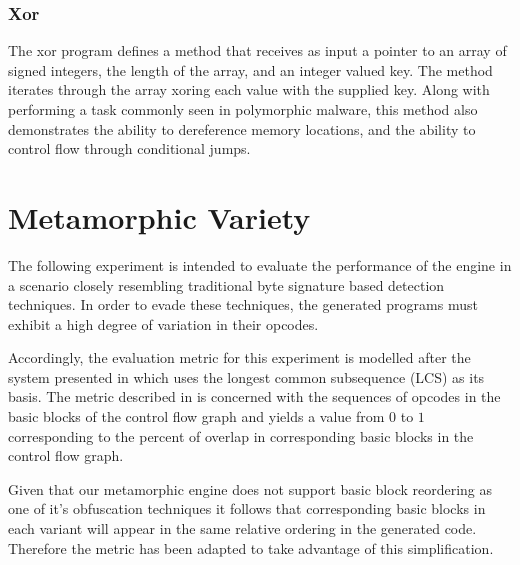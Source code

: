         \subsubsection{Xor}

            The xor program defines a method that receives as input a
            pointer to an array of signed integers, the length of the array,
            and an integer valued key. The method iterates through the array
            xoring each value with the supplied key. Along with performing a
            task commonly seen in polymorphic malware, this method also
            demonstrates the ability to dereference memory locations, and
            the ability to control flow through conditional jumps.
        
\section{Metamorphic Variety}
    
    The following experiment is intended to evaluate the performance of the
    engine in a scenario closely resembling traditional byte signature based
    detection techniques. In order to evade these techniques, the generated
    programs must exhibit a high degree of variation in their opcodes.

    Accordingly, the evaluation metric for this experiment is modelled after
    the system presented in \cite{cfg_lcs} which uses the longest common
    subsequence (LCS) as its basis. The metric described in \cite{cfg_lcs}
    is concerned with the sequences of opcodes in the basic blocks of the
    control flow graph and yields a value from $0$ to $1$ corresponding to
    the percent of overlap in corresponding basic blocks in the control flow
    graph.
    
    Given that our metamorphic engine does not support basic block
    reordering as one of it's obfuscation techniques it follows that
    corresponding basic blocks in each variant will appear in the same
    relative ordering in the generated code. Therefore the metric has been
    adapted to take advantage of this simplification.

